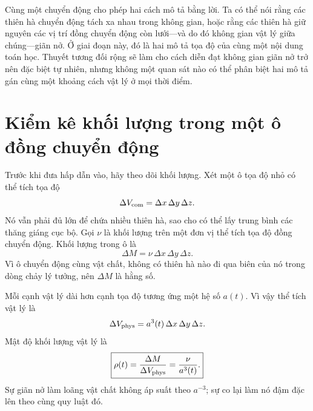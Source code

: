 \begin{classroomqa}
\end{classroomqa}

Cùng một chuyển động cho phép hai cách mô tả bằng lời. Ta có thể nói rằng các thiên hà chuyển động tách xa nhau trong không gian, hoặc rằng các thiên hà giữ nguyên các vị trí đồng chuyển động còn lưới---và do đó không gian vật lý giữa chúng---giãn nở. Ở giai đoạn này, đó là hai mô tả tọa độ của cùng một nội dung toán học. Thuyết tương đối rộng sẽ làm cho cách diễn đạt không gian giãn nở trở nên đặc biệt tự nhiên, nhưng không một quan sát nào có thể phân biệt hai mô tả gán cùng một khoảng cách vật lý ở mọi thời điểm.

\section{Kiểm kê khối lượng trong một ô đồng chuyển động}

Trước khi đưa hấp dẫn vào, hãy theo dõi khối lượng. Xét một ô tọa độ nhỏ có thể tích tọa độ
\begin{equation}
\Delta V_{\rm com}=\Delta x\,\Delta y\,\Delta z.
\end{equation}
Nó vẫn phải đủ lớn để chứa nhiều thiên hà, sao cho có thể lấy trung bình các thăng giáng cục bộ. Gọi \(\nu\) là khối lượng trên một đơn vị thể tích tọa độ đồng chuyển động. Khối lượng trong ô là
\begin{equation}
\Delta M=\nu\,\Delta x\,\Delta y\,\Delta z.
\label{eq:c01-comoving-mass}
\end{equation}
Vì ô chuyển động cùng vật chất, không có thiên hà nào đi qua biên của nó trong dòng chảy lý tưởng, nên \(\Delta M\) là hằng số.

Mỗi cạnh vật lý dài hơn cạnh tọa độ tương ứng một hệ số \(a(t)\). Vì vậy thể tích vật lý là
\begin{equation}
\Delta V_{\rm phys}=a^3(t)\,\Delta x\,\Delta y\,\Delta z.
\end{equation}
Mật độ khối lượng vật lý là
\begin{equation}
\boxed{\rho(t)=\frac{\Delta M}{\Delta V_{\rm phys}}=\frac{\nu}{a^3(t)}.}
\label{eq:c01-density-dilution}
\end{equation}
Sự giãn nở làm loãng vật chất không áp suất theo \(a^{-3}\); sự co lại làm nó đậm đặc lên theo cùng quy luật đó.

